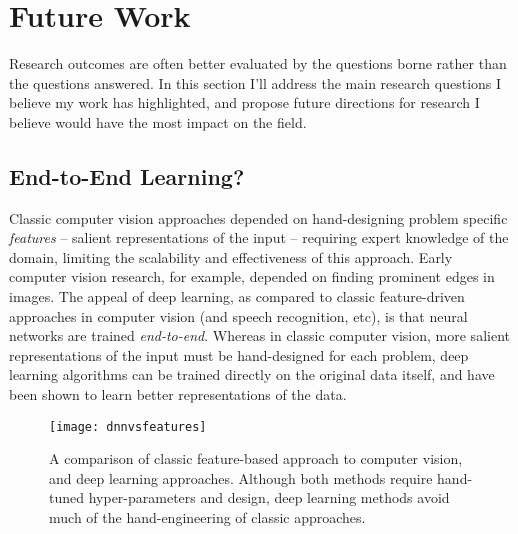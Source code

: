 \documentclass[thesis]{subfiles}
\begin{document}

\chapter{Future Work}  %
\label{futurework}


Research outcomes are often better evaluated by the questions borne rather than the questions answered. In this section I'll address the main research questions I believe my work has highlighted, and propose future directions for research I believe would have the most impact on the field.

\section{End-to-End Learning?}
Classic computer vision approaches depended on hand-designing problem specific \emph{features} -- salient representations of the input -- requiring expert knowledge of the domain, limiting the scalability and effectiveness of this approach. Early computer vision research, for example, depended on finding prominent edges in images. The appeal of deep learning, as compared to classic feature-driven approaches in computer vision (and speech recognition, etc), is that neural networks are trained \emph{end-to-end}. Whereas in classic computer vision, more salient representations of the input must be hand-designed for each problem, deep learning algorithms can be trained directly on the original data itself, and have been shown to learn better representations of the data.

\begin{figure}[tbp]
	\centering
	\texttt{[image: dnnvsfeatures]}
	\caption{A comparison of classic feature-based approach to computer vision, and deep learning approaches. Although both methods require hand-tuned hyper-parameters and design, deep learning methods avoid much of the hand-engineering of classic approaches.}
	\label{dnnvsfeatures}
\end{figure}
	
\end{document}
